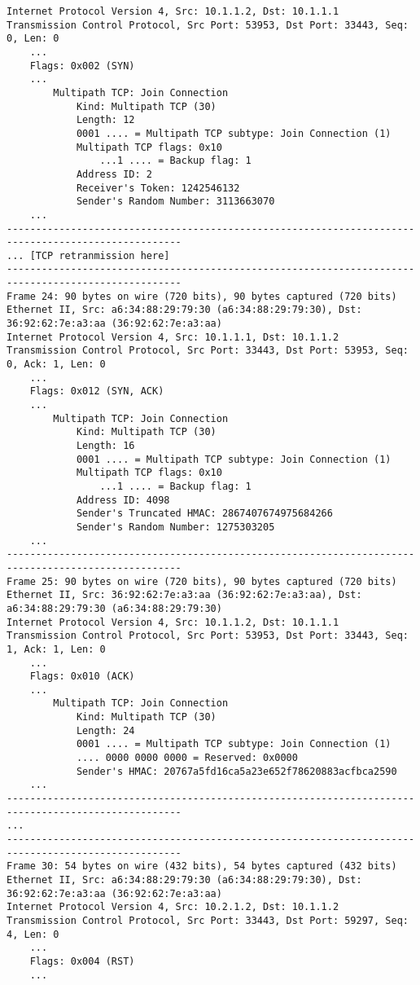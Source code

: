 \begin{verbatim}
Internet Protocol Version 4, Src: 10.1.1.2, Dst: 10.1.1.1
Transmission Control Protocol, Src Port: 53953, Dst Port: 33443, Seq: 0, Len: 0
    ...
    Flags: 0x002 (SYN)
    ...
        Multipath TCP: Join Connection
            Kind: Multipath TCP (30)
            Length: 12
            0001 .... = Multipath TCP subtype: Join Connection (1)
            Multipath TCP flags: 0x10
                ...1 .... = Backup flag: 1
            Address ID: 2
            Receiver's Token: 1242546132
            Sender's Random Number: 3113663070
    ...
----------------------------------------------------------------------------------------------------
... [TCP retranmission here]
----------------------------------------------------------------------------------------------------
Frame 24: 90 bytes on wire (720 bits), 90 bytes captured (720 bits)
Ethernet II, Src: a6:34:88:29:79:30 (a6:34:88:29:79:30), Dst: 36:92:62:7e:a3:aa (36:92:62:7e:a3:aa)
Internet Protocol Version 4, Src: 10.1.1.1, Dst: 10.1.1.2
Transmission Control Protocol, Src Port: 33443, Dst Port: 53953, Seq: 0, Ack: 1, Len: 0
    ...
    Flags: 0x012 (SYN, ACK)
    ...
        Multipath TCP: Join Connection
            Kind: Multipath TCP (30)
            Length: 16
            0001 .... = Multipath TCP subtype: Join Connection (1)
            Multipath TCP flags: 0x10
                ...1 .... = Backup flag: 1
            Address ID: 4098
            Sender's Truncated HMAC: 2867407674975684266
            Sender's Random Number: 1275303205
    ...
----------------------------------------------------------------------------------------------------
Frame 25: 90 bytes on wire (720 bits), 90 bytes captured (720 bits)
Ethernet II, Src: 36:92:62:7e:a3:aa (36:92:62:7e:a3:aa), Dst: a6:34:88:29:79:30 (a6:34:88:29:79:30)
Internet Protocol Version 4, Src: 10.1.1.2, Dst: 10.1.1.1
Transmission Control Protocol, Src Port: 53953, Dst Port: 33443, Seq: 1, Ack: 1, Len: 0
    ...
    Flags: 0x010 (ACK)
    ...
        Multipath TCP: Join Connection
            Kind: Multipath TCP (30)
            Length: 24
            0001 .... = Multipath TCP subtype: Join Connection (1)
            .... 0000 0000 0000 = Reserved: 0x0000
            Sender's HMAC: 20767a5fd16ca5a23e652f78620883acfbca2590
    ...
----------------------------------------------------------------------------------------------------
...
----------------------------------------------------------------------------------------------------
Frame 30: 54 bytes on wire (432 bits), 54 bytes captured (432 bits)
Ethernet II, Src: a6:34:88:29:79:30 (a6:34:88:29:79:30), Dst: 36:92:62:7e:a3:aa (36:92:62:7e:a3:aa)
Internet Protocol Version 4, Src: 10.2.1.2, Dst: 10.1.1.2
Transmission Control Protocol, Src Port: 33443, Dst Port: 59297, Seq: 4, Len: 0
    ...
    Flags: 0x004 (RST)
    ...
	\end{verbatim}
\endgroup